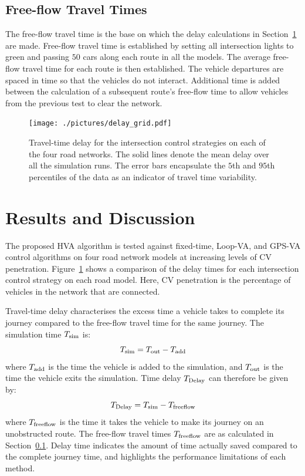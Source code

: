 \documentclass[numbered]{trbunofficial}
\begin{document}
\subsection{Free-flow Travel Times}\label{sec:freeflow}
The free-flow travel time is the base on which the delay calculations in Section~\ref{sec:discussion} are made. Free-flow travel time is established by setting all intersection lights to green and passing $50$ cars along each route in all the models. The average free-flow travel time for each route is then established. The vehicle departures are spaced in time so that the vehicles do not interact. Additional time is added between the calculation of a subsequent route's free-flow time to allow vehicles from the previous test to clear the network.

\begin{figure}[!tb]
	\begin{center} 
		\texttt{[image: ./pictures/delay\_grid.pdf]}
		\vspace{-5pt}
		\caption{Travel-time delay for the intersection control strategies on each of the four road networks. The solid lines denote the mean delay over all the simulation runs. The error bars encapsulate the $5$th and $95$th percentiles of the data as an indicator of travel time variability.}
		\label{fig:results}
	\end{center}
	\vspace{-5pt}
\end{figure}

\section{Results and Discussion}\label{sec:discussion}
The proposed HVA algorithm is tested against fixed-time, Loop-VA, and GPS-VA control algorithms on four road network models at increasing levels of CV penetration. Figure~\ref{fig:results} shows a comparison of the delay times for each intersection control strategy on each road model. Here, CV penetration is the percentage of vehicles in the network that are connected. 

Travel-time delay characterises the excess time a vehicle takes to complete its journey compared to the free-flow travel time for the same journey. The simulation time $T_{\rm sim}$ is:
\begin{equation}
T_{\rm sim} = T_{\rm out} - T_{\rm add}
\end{equation}
where $T_{\rm add}$ is the time the vehicle is added to the simulation, and $T_{\rm out}$ is the time the vehicle exits the simulation. Time delay $T_{\rm Delay}$ can therefore be given by:
\begin{equation}
T_{\rm Delay} = T_{\rm sim} - T_{\rm freeflow}
\end{equation}	
where $T_{\rm freeflow}$ is the time it takes the vehicle to make its journey on an unobstructed route. The free-flow travel times $T_{\rm freeflow}$ are as calculated in Section~\ref{sec:freeflow}. Delay time indicates the amount of time actually saved compared to the complete journey time, and highlights the performance limitations of each method.
\end{document}
